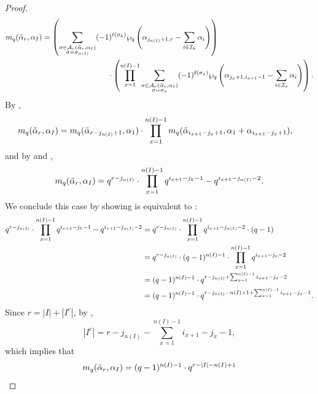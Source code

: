 \documentclass[10pt]{article}
\newcommand{\hr}[0]{\Tilde{\alpha}}
\newcommand{\qpartition}[1]{\wp_q\left(#1\right)}
\begin{document}
\begin{proof}
    \begin{align}
        m_q(\hr_r,\alpha_I)
        &= \left(\sum_{\substack{\sigma\in\mathcal{A}_{r}(\hr_r,\alpha_I) \\ \sigma = \sigma_{n(I)}}}(-1)^{\ell(\sigma_k)}\qpartition{\alpha_{j_{n(I)}+1,r}-\sum_{i\in\mathcal{I}_k}\alpha_i}\right)\notag\\
        &\hspace{3cm}\cdot \left(\prod_{x=1}^{n(I)-1}\sum_{\substack{\sigma\in\mathcal{A}_r(\hr_r,\alpha_I)\\ \sigma = \sigma_x}}(-1)^{\ell(\sigma_x)}\qpartition{\alpha_{j_x+1,i_{x+1}-1}-\sum_{i\in\mathcal{I}_x}\alpha_i}\right).\label{case 3 starting point}
    \end{align}
    By ,
    \begin{align}
        m_q(\hr_r,\alpha_I)
        &= m_q(\hr_{r-j_{n(I)}+1},\alpha_1)\cdot \prod_{x=1}^{n(I)-1}m_q(\hr_{i_{x+1}-j_x+1},\alpha_1+\alpha_{i_{x+1}-j_x+1}),\notag
    \end{align}
    and by  and ,
    \begin{equation}
        m_q(\hr_r,\alpha_I) = q^{r-j_{n(I)}} \cdot \prod_{x=1}^{n(I)-1}q^{i_{x+1}-j_k-1}-q^{i_{x+1}-j_{n(I)}-2}.\label{Case 3 with best lemma used}
    \end{equation}
    We conclude this case by showing  is equivalent to :
    \begin{align}
        q^{r-j_{n(I)}} \cdot \prod_{x=1}^{n(I)-1}q^{i_{x+1}-j_k-1}-q^{i_{x+1}-j_{n(I)}-2}&=q^{r-j_{n(I)}} \cdot \prod_{x=1}^{n(I)-1}q^{i_{x+1}-j_{n(I)}-2}\cdot(q-1)\notag \\
        &= q^{r-j_{n(I)}}\cdot(q-1)^{n(I)-1}\cdot\prod_{x=1}^{n(I)-1}q^{i_{x+1}-j_x-2} \notag \\
        &=(q-1)^{n(I)-1} \cdot q^{r-j_{n(I)}+\sum_{x=1}^{n(I)-1}i_{x+1}-j_x-2} \notag\\
        &= (q-1)^{n(I)-1}\cdot q^{r-j_{n(I)}-n(I)+1+\sum_{x=1}^{n(I)-1}i_{x+1}-j_x-1}.\label{eq: case 3 so so close}
    \end{align}
    Since $r=|I|+|I^c|$, by , 
    \begin{equation}
        |I^c| = r-j_{n(I)} - \sum_{x=1}^{n(I)-1} i_{x+1}-j_x-1,
    \end{equation}
    which implies that
    \begin{equation}
        m_q(\hr_{r},\alpha_I) = (q-1)^{n(I)-1}\cdot q^{r-|I|-n(I)+1}\notag

\end{equation}
\end{proof}
\end{document}
